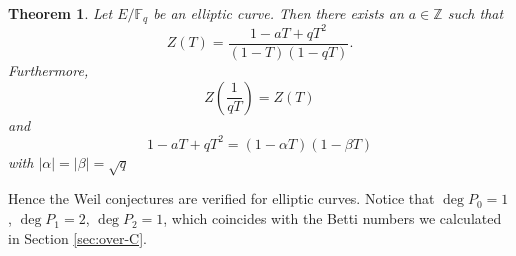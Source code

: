 \documentclass{article}
\newtheorem{theorem}{Theorem}[section]
\theoremstyle{definition}
\theoremstyle{remark}
\newcommand{\F}{\mathbb{F}}
\newcommand{\Z}{\mathbb{Z}}
\begin{document}
\begin{theorem}
	Let $E/\F_q$ be an elliptic curve. Then there exists an $a \in \Z$ such that
	\begin{equation*}
		Z(T) = \frac{1 - aT + qT^2}{(1-T)(1-qT)}.
	\end{equation*}
	Furthermore,
	\begin{equation*}
		Z\left(\frac{1}{qT}\right) = Z(T)
	\end{equation*}
	and
	\begin{equation*}
		1 - aT + qT^2 = (1 - \alpha T)(1 - \beta T)
	\end{equation*}
	with $|\alpha| = |\beta| = \sqrt{q}$
\end{theorem}

Hence the Weil conjectures are verified for elliptic curves. Notice that
$\deg P_0 = 1$, $\deg P_1 = 2$, $\deg P_2 = 1$, which coincides with the
Betti numbers we calculated in Section \ref{sec:over-C}.
\end{document}
